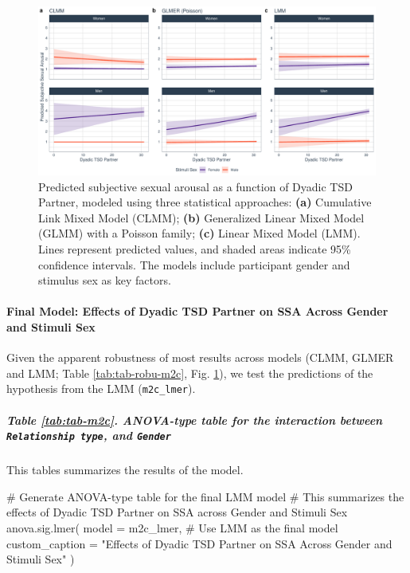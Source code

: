 \documentclass[
  bookmarksnumbered]{article}
\newenvironment{Shaded}{\begin{snugshade}}{\end{snugshade}}
\newcommand{\AttributeTok}[1]{\textcolor[rgb]{0.80,0.80,0.80}{#1}}
\newcommand{\CommentTok}[1]{\textcolor[rgb]{0.50,0.62,0.50}{#1}}
\newcommand{\FunctionTok}[1]{\textcolor[rgb]{0.94,0.94,0.56}{#1}}
\newcommand{\NormalTok}[1]{\textcolor[rgb]{0.80,0.80,0.80}{#1}}
\newcommand{\StringTok}[1]{\textcolor[rgb]{0.80,0.58,0.58}{#1}}
\begin{document}
\begin{figure}
\centering
\includegraphics{Sexual_Desire_Arousal_anonymous_files/figure-latex/preds-m2c-1.pdf}
\caption{\label{fig:preds-m2c}Predicted subjective sexual arousal as a function of Dyadic TSD Partner, modeled using three statistical approaches: \textbf{(a)} Cumulative Link Mixed Model (CLMM); \textbf{(b)} Generalized Linear Mixed Model (GLMM) with a Poisson family; \textbf{(c)} Linear Mixed Model (LMM). Lines represent predicted values, and shaded areas indicate 95\% confidence intervals. The models include participant gender and stimulus sex as key factors.}
\end{figure}

\paragraph{Final Model: Effects of Dyadic TSD Partner on SSA Across Gender and Stimuli Sex}\label{final-model-effects-of-dyadic-tsd-partner-on-ssa-across-gender-and-stimuli-sex}

Given the apparent robustness of most results across models (CLMM, GLMER and LMM; Table \ref{tab:tab-robu-m2c}, Fig. \ref{fig:preds-m2c}), we test the predictions of the hypothesis from the LMM (\texttt{m2c\_lmer}).

\subparagraph{\texorpdfstring{Table \ref{tab:tab-m2c}. ANOVA-type table for the interaction between \texttt{Relationship\ type}, and \texttt{Gender}}{Table \ref{tab:tab-m2c}. ANOVA-type table for the interaction between Relationship type, and Gender}}\label{table-reftabtab-m2c.-anova-type-table-for-the-interaction-between-relationship-type-and-gender}

This tables summarizes the results of the model.

\begin{Shaded}
\begin{Highlighting}[]
\CommentTok{\# Generate ANOVA{-}type table for the final LMM model}
\CommentTok{\# This summarizes the effects of Dyadic TSD Partner on SSA across Gender and Stimuli Sex}
\FunctionTok{anova.sig.lmer}\NormalTok{(}
  \AttributeTok{model =}\NormalTok{ m2c\_lmer, }\CommentTok{\# Use LMM as the final model}
  \AttributeTok{custom\_caption =} \StringTok{"Effects of Dyadic TSD Partner on SSA Across Gender and Stimuli Sex"}
\NormalTok{)}
\end{Highlighting}
\end{Shaded}
\end{document}
